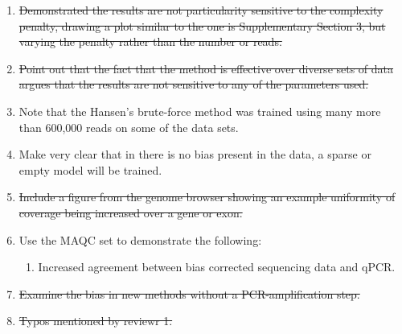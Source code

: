 \documentclass{article}
\begin{document}

\begin{enumerate}

\item \sout{Demonstrated the results are not particularity sensitive to the
complexity penalty, drawing a plot similar to the one is Supplementary Section
3, but varying the penalty rather than the number or reads.}

\item \sout{Point out that the fact that the method is effective over diverse sets of
data argues that the results are not sensitive to any of the parameters used.}

\item Note that the Hansen's brute-force method was trained using many more than
600,000 reads on some of the data sets.


\item Make very clear that in there is no bias present in the data, a sparse or
empty model will be trained.

\item \sout{Include a figure from the genome browser showing an example uniformity of
coverage being increased over a gene or exon.}

\item Use the MAQC set to demonstrate the following:
\begin{enumerate}
\item Increased agreement between bias corrected sequencing data and qPCR.
\end{enumerate}

\item \sout{Examine the bias in new methods without a PCR-amplification step.}

\item \sout{Typos mentioned by reviewr 1.}


\end{enumerate}
\end{document}
